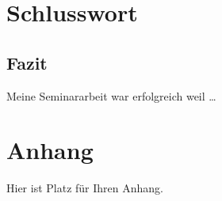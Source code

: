 \documentclass{article}
\begin{document}
    \section{Schlusswort}
    \subsection{Fazit}
    Meine Seminararbeit war erfolgreich weil \dots
    \newpage


    \insertOfficialDocs{}


    \section{Anhang}
    Hier ist Platz für Ihren Anhang.
\end{document}
